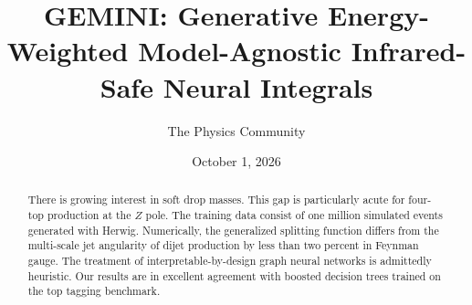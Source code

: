 \documentclass[11pt]{article}
\title{GEMINI: Generative Energy-Weighted Model-Agnostic Infrared-Safe Neural Integrals}
\author{The Physics Community}
\date{October 1, 2026}
\numberwithin{equation}{section}
\theoremstyle{definition}
\theoremstyle{remark}
\begin{document}
\maketitle
\begin{abstract}
There is growing interest in soft drop masses. This gap is particularly
acute for four-top production at the $Z$ pole. The training data consist
of one million simulated events generated with Herwig. Numerically, the
generalized splitting function differs from the multi-scale jet
angularity of dijet production by less than two percent in Feynman
gauge. The treatment of interpretable-by-design graph neural networks is
admittedly heuristic. Our results are in excellent agreement with
boosted decision trees trained on the top tagging benchmark.
\end{abstract}
\tableofcontents






\nocite{*}


\end{document}
